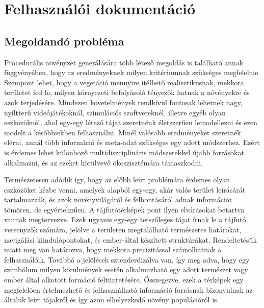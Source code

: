 \chapter{Felhasználói dokumentáció}
\label{ch:user}


\section{Megoldandó probléma}
Procedurális növényzet generálására több létező megoldás is található annak függvényében, hogy az eredményeknek milyen kritériumnak szükséges megfelelnie. Szempont lehet, hogy a vegetáció mennyire ítélhető realisztikusnak, mekkora területet fed le, milyen környezeti befolyásoló tényezők hatnak a növényekre és azok terjedésére. Mindezen követelmények rendkívül fontosak lehetnek nagy, nyíltterű videójátékoknál, szimulációs szoftvereknél, illetve egyéb olyan eszközöknél, ahol egy-egy létező tájat szeretnénk életszerűen lemodellezni és ezen modelt a későbbiekben felhasználni. Minél valósabb eredményeket szeretnék elérni, annál több információ és meta-adat szükséges egy adott módszerhez. Ezért is érdemes lehet különböző multidiszciplináris módszerekkel újabb forrásokat alkalmazni, és az ezeket körülvevő ökoszisztémára támaszkodni.\newline

Természetesen adódik így, hogy az előbb leírt problémára érdemes olyan eszközöket kézbe venni, amelyek alapból egy-egy, akár valós terület leírásárát tartalmazzák, és azok növényvilágáról és felbontásáról adnak információt tömören, de egyértelműen. A tájfutótérképek pont ilyen elvárásokat betartva vannak megtervezve. Ezek ugyanis egy-egy tetszőleges tájat írnak le a tájfutó versenyzők számára, jelölve a területen megtalálható természetes határokat, navigálási kiindulópontokat, és ember-által készített struktúrákat. Rendeltetésük miatt meg van határozva, hogy mekkora precizitással számolhatnak a felhasználóik. Továbbá a jelölések sztenderdizálva van, így meg adva, hogy egy szimbólum milyen körülmények esetén alkalmazható egy adott természet vagy ember által alkotott formáció feltüntetésére. Összegezve, ezek a térképek egy megfelelően értelmezhető és felhasználható információ forrásnak bizonyulnak az általuk leírt tájakról és így azon elhelyezkedő növény populációról is. \newline

